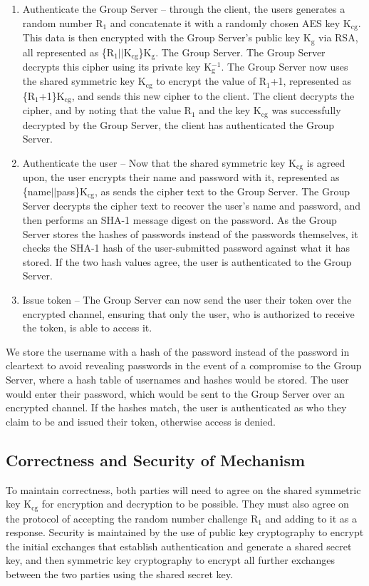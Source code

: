 \documentclass[11pt]{article}
\begin{document}
\begin{enumerate}
\item{}Authenticate the Group Server -- through the client, the users generates a random number R$_1$ and concatenate it with a randomly chosen AES key K$_{\text{cg}}$. This data is then encrypted with the Group Server's public key K$_\text{g}$ via RSA, all represented as \{R$_1||$K$_{\text{cg}}$\}K$_\text{g}$. The Group Server. The Group Server decrypts this cipher using its private key K$_\text{g}^{-1}$. The Group Server now uses the shared symmetric key K$_{\text{cg}}$ to encrypt the value of R$_1$+1, represented as \{R$_1$+1\}K$_{\text{cg}}$, and sends this new cipher to the client. The client decrypts the cipher, and by noting that the value R$_1$ and the key K$_\text{cg}$ was successfully decrypted by the Group Server, the client has authenticated the Group Server.
\item{}Authenticate the user -- Now that  the shared symmetric key K$_\text{cg}$ is agreed upon, the user encrypts their name and password with it, represented as \{name$||$pass\}K$_\text{cg}$, as sends the cipher text to the Group Server. The Group Server decrypts the cipher text to recover the user's name and password, and then performs an SHA-1 message digest on the password. As the Group Server stores the hashes of passwords instead of the passwords themselves, it checks the SHA-1 hash of the user-submitted password against what it has stored. If the two hash values agree, the user is authenticated to the Group Server.
\item{}Issue token -- The Group Server can now send the user their token over the encrypted channel, ensuring that only the user, who is authorized to receive the token, is able to access it.
\end{enumerate}
We store the username with a hash of the password instead of the password in cleartext to avoid revealing passwords in the event of a compromise to the Group Server, where a hash table of usernames and hashes would be stored. The user would enter their password, which would be sent to the Group Server over an encrypted channel. If the hashes match, the user is authenticated as who they claim to be and issued their token, otherwise access is denied.
\subsection{Correctness and Security of Mechanism}
To maintain correctness, both parties will need to agree on the shared symmetric key K$_\text{cg}$ for encryption and decryption to be possible. They must also agree on the protocol of accepting the random number challenge R$_1$ and adding to it as a response. Security is maintained by the use of public key cryptography to encrypt the initial exchanges that establish authentication and generate a shared secret key, and then symmetric key cryptography to encrypt all further exchanges between the two parties using the shared secret key.
\end{document}
